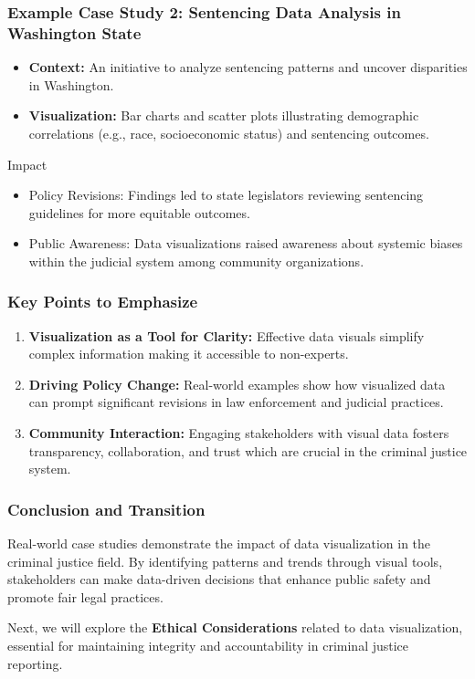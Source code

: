\documentclass[aspectratio=169]{beamer}
\begin{document}
\begin{frame}[fragile]
    \frametitle{Example Case Study 2: Sentencing Data Analysis in Washington State}
    \begin{itemize}
        \item \textbf{Context:} An initiative to analyze sentencing patterns and uncover disparities in Washington.
        \item \textbf{Visualization:} Bar charts and scatter plots illustrating demographic correlations (e.g., race, socioeconomic status) and sentencing outcomes.
    \end{itemize}
    \begin{block}{Impact}
        \begin{itemize}
            \item Policy Revisions: Findings led to state legislators reviewing sentencing guidelines for more equitable outcomes.
            \item Public Awareness: Data visualizations raised awareness about systemic biases within the judicial system among community organizations.
        \end{itemize}
    \end{block}
\end{frame}

\begin{frame}[fragile]
    \frametitle{Key Points to Emphasize}
    \begin{enumerate}
        \item \textbf{Visualization as a Tool for Clarity:} Effective data visuals simplify complex information making it accessible to non-experts.
        \item \textbf{Driving Policy Change:} Real-world examples show how visualized data can prompt significant revisions in law enforcement and judicial practices.
        \item \textbf{Community Interaction:} Engaging stakeholders with visual data fosters transparency, collaboration, and trust which are crucial in the criminal justice system.
    \end{enumerate}
\end{frame}

\begin{frame}[fragile]
    \frametitle{Conclusion and Transition}
    Real-world case studies demonstrate the impact of data visualization in the criminal justice field. By identifying patterns and trends through visual tools, stakeholders can make data-driven decisions that enhance public safety and promote fair legal practices. 

    Next, we will explore the \textbf{Ethical Considerations} related to data visualization, essential for maintaining integrity and accountability in criminal justice reporting.
\end{frame}
\end{document}
